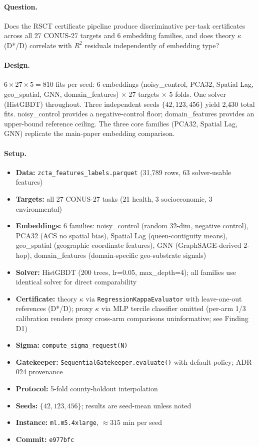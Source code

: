 \documentclass{article}
\begin{document}
\paragraph{Question.} Does the RSCT certificate pipeline produce discriminative per-task certificates across all 27 CONUS-27 targets and 6 embedding families, and does theory $\kappa$ (D*/D) correlate with $R^2$ residuals independently of embedding type?

\paragraph{Design.} $6 \times 27 \times 5 = 810$ fits per seed: 6 embeddings (noisy\_control, PCA32, Spatial Lag, geo\_spatial, GNN, domain\_features) $\times$ 27 targets $\times$ 5 folds. One solver (HistGBDT) throughout. Three independent seeds $\{42, 123, 456\}$ yield 2{,}430 total fits. noisy\_control provides a negative-control floor; domain\_features provides an upper-bound reference ceiling. The three core families (PCA32, Spatial Lag, GNN) replicate the main-paper embedding comparison.

\paragraph{Setup.}
\begin{itemize}
\item \textbf{Data:} \texttt{zcta\_features\_labels.parquet} (31{,}789 rows, 63 solver-usable features)
\item \textbf{Targets:} all 27 CONUS-27 tasks (21 health, 3 socioeconomic, 3 environmental)
\item \textbf{Embeddings:} 6 families: noisy\_control (random 32-dim, negative control), PCA32 (ACS no spatial bias), Spatial Lag (queen-contiguity means), geo\_spatial (geographic coordinate features), GNN (GraphSAGE-derived 2-hop), domain\_features (domain-specific geo-substrate signals)
\item \textbf{Solver:} HistGBDT (200 trees, lr=0.05, max\_depth=4); all families use identical solver for direct comparability
\item \textbf{Certificate:} theory $\kappa$ via \texttt{RegressionKappaEvaluator} with leave-one-out references (D*/D); proxy $\kappa$ via MLP tercile classifier omitted (per-arm 1/3 calibration renders proxy cross-arm comparisons uninformative; see Finding D1)
\item \textbf{Sigma:} \texttt{compute\_sigma\_request(N)}
\item \textbf{Gatekeeper:} \texttt{SequentialGatekeeper.evaluate()} with default policy; ADR-024 provenance
\item \textbf{Protocol:} 5-fold county-holdout interpolation
\item \textbf{Seeds:} $\{42, 123, 456\}$; results are seed-mean unless noted
\item \textbf{Instance:} \texttt{ml.m5.4xlarge}, ${\approx}315$ min per seed
\item \textbf{Commit:} \texttt{e977bfc}
\end{itemize}
\end{document}
